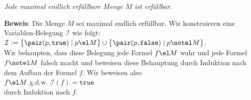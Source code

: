 \begin{Satz} \label{satz30}
{\em
  Jede maximal endlich erf\"{u}llbare Menge $M$ ist erf\"{u}llbar.
}
\end{Satz}

\noindent
\textbf{Beweis}:
Die Menge $M$ sei maximal endlich erf\"{u}llbar.  Wir konstruieren eine Variablen-Belegung
$\mathcal{I}$ wie folgt:
\\[0.2cm]
\hspace*{1.3cm}
$\mathcal{I} := \bigl\{ \pair(p, \mathtt{true})  \mid p \el M \bigr\} \cup
                \bigl\{ \pair(p, \mathtt{false}) \mid p \notel M \bigr\}$.
\\[0.2cm]
Wir behaupten, dass diese Belegung  jede Formel $f\el M$ wahr und jede Formel $f \notel M$
falsch macht und beweisen diese
Behauptung durch Induktion nach dem Aufbau der Formel $f$. Wir beweisen also
\\[-0.2cm]
\hspace*{1.3cm}
$f \el M$ \quad g.d.w. \quad $\mathcal{I}(f) = \mathtt{true}$
\\[0.2cm]
durch Induktion nach $f$.
